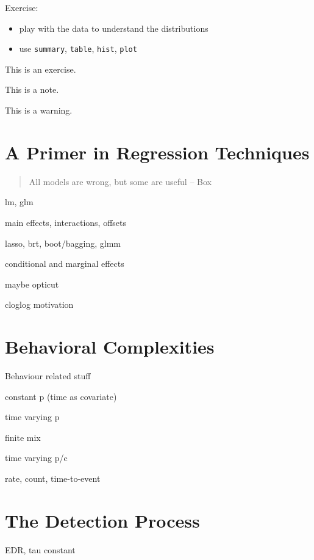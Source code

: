 \documentclass[12pt,]{book}
\providecommand{\tightlist}{%
  \setlength{\itemsep}{0pt}\setlength{\parskip}{0pt}}
\let\BeginKnitrBlock\begin \let\EndKnitrBlock\end
\begin{document}
Exercise:

\begin{itemize}
\tightlist
\item
  play with the data to understand the distributions
\item
  use \texttt{summary}, \texttt{table}, \texttt{hist}, \texttt{plot}
\end{itemize}

\BeginKnitrBlock{rmdexercise}
This is an exercise.
\EndKnitrBlock{rmdexercise}

\BeginKnitrBlock{rmdnote}
This is a note.
\EndKnitrBlock{rmdnote}

\BeginKnitrBlock{rmdwarning}
This is a warning.
\EndKnitrBlock{rmdwarning}

\hypertarget{regression}{%
\chapter{A Primer in Regression Techniques}\label{regression}}

\begin{quote}
All models are wrong, but some are useful -- Box
\end{quote}

lm, glm

main effects, interactions, offsets

lasso, brt, boot/bagging, glmm

conditional and marginal effects

maybe opticut

cloglog motivation

\hypertarget{behavior}{%
\chapter{Behavioral Complexities}\label{behavior}}

Behaviour related stuff

constant p (time as covariate)

time varying p

finite mix

time varying p/c

rate, count, time-to-event

\hypertarget{detection}{%
\chapter{The Detection Process}\label{detection}}

EDR, tau constant
\end{document}
